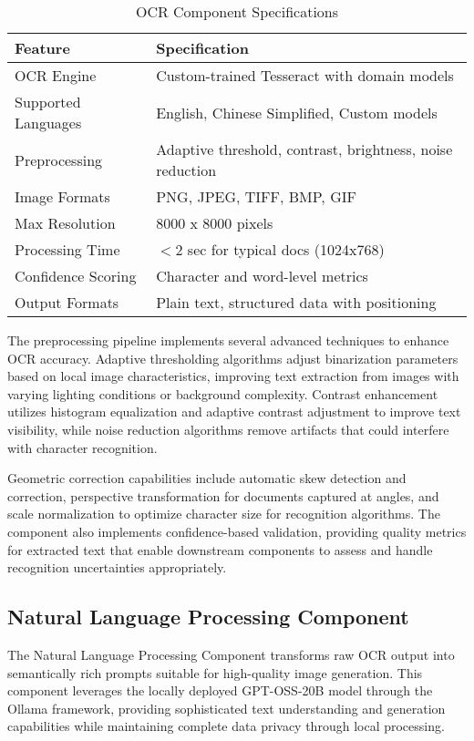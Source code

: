 \begin{table}[H]
\centering
\small
\caption{OCR Component Specifications}
\label{tab:ocr_specifications}
\begin{tabular}{ll}
\toprule
\textbf{Feature} & \textbf{Specification} \\
\midrule
OCR Engine & Custom-trained Tesseract with domain models \\
Supported Languages & English, Chinese Simplified, Custom models \\
Preprocessing & Adaptive threshold, contrast, brightness, noise reduction \\
Image Formats & PNG, JPEG, TIFF, BMP, GIF \\
Max Resolution & 8000 x 8000 pixels \\
Processing Time & $<$2 sec for typical docs (1024x768) \\
Confidence Scoring & Character and word-level metrics \\
Output Formats & Plain text, structured data with positioning \\
\bottomrule
\end{tabular}
\end{table}

The preprocessing pipeline implements several advanced techniques to enhance OCR accuracy. Adaptive thresholding algorithms adjust binarization parameters based on local image characteristics, improving text extraction from images with varying lighting conditions or background complexity. Contrast enhancement utilizes histogram equalization and adaptive contrast adjustment to improve text visibility, while noise reduction algorithms remove artifacts that could interfere with character recognition.

Geometric correction capabilities include automatic skew detection and correction, perspective transformation for documents captured at angles, and scale normalization to optimize character size for recognition algorithms. The component also implements confidence-based validation, providing quality metrics for extracted text that enable downstream components to assess and handle recognition uncertainties appropriately.

\subsection{Natural Language Processing Component}

The Natural Language Processing Component transforms raw OCR output into semantically rich prompts suitable for high-quality image generation. This component leverages the locally deployed GPT-OSS-20B model through the Ollama framework, providing sophisticated text understanding and generation capabilities while maintaining complete data privacy through local processing.

